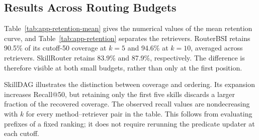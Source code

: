 \subsection{Results Across Routing Budgets}
\label{app:retention-results}
Table~\ref{tab:app-retention-mean} gives the numerical values of the mean retention curve, and Table~\ref{tab:app-retention} separates the retrievers. RouterBSI retains 90.5\% of its cutoff-50 coverage at $k=5$ and 94.6\% at $k=10$, averaged across retrievers. SkillRouter retains 83.9\% and 87.9\%, respectively. The difference is therefore visible at both small budgets, rather than only at the first position.

SkillDAG illustrates the distinction between coverage and ordering. Its expansion increases Recall@50, but retaining only the first five skills discards a larger fraction of the recovered coverage. The observed recall values are nondecreasing with $k$ for every method--retriever pair in the table. This follows from evaluating prefixes of a fixed ranking; it does not require rerunning the predicate updater at each cutoff.



